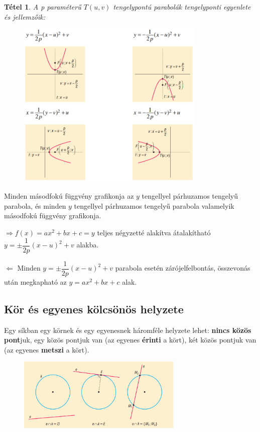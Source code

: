 \documentclass[12pt,a4paper]{article}
\newtheorem{theorem}{Tétel} [section]
\begin{document}
\begin{theorem}
A p paraméterű $T(u, v)$ tengelypontú parabolák tengelyponti egyenlete és jellemzőik:
\begin{figure}[h]
\centering
\includegraphics[width=0.8\textwidth]{parabolak}
\end{figure}
\end{theorem}

Minden másodfokú függvény grafikonja az $y$ tengellyel párhuzamos tengelyű parabola, és minden $y$ tengellyel párhuzamos tengelyű parabola valamelyik másodfokú függvény grafikonja.

$\Rightarrow f(x)=ax^2+bx+c=y$ teljes négyzetté alakítva átalakítható $y=\pm \dfrac{1}{2p}(x-u)^2+v$ alakba.

$\Leftarrow$ Minden $y=\pm \dfrac{1}{2p}(x-u)^2+v$ parabola esetén zárójelfelbontás, összevonás után megkapható az $y=ax^2+bx+c$ alak.
\newpage
\subsection{Kör és egyenes kölcsönös helyzete}
Egy síkban egy körnek és egy egyenesnek háromféle helyzete lehet: \textbf{nincs közös pont}juk, egy közös pontjuk van (az egyenes \textbf{érinti} a kört), két közös pontjuk van (az egyenes \textbf{metszi} a kört).
\begin{figure}[h]
\centering
\includegraphics[width=0.7\textwidth]{kor_egyenes_metszespont}
\end{figure}
\end{document}
